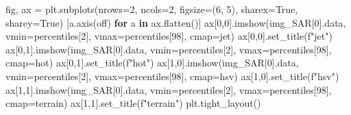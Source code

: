\documentclass[
  french,
  11pt,
  letterpaper,
  open=any,
  twoside=false,
  french]{scrbook}
\newenvironment{Shaded}{\begin{snugshade}}{\end{snugshade}}
\newcommand{\ControlFlowTok}[1]{\textcolor[rgb]{0.00,0.23,0.31}{\textbf{#1}}}
\newcommand{\DecValTok}[1]{\textcolor[rgb]{0.68,0.00,0.00}{#1}}
\newcommand{\KeywordTok}[1]{\textcolor[rgb]{0.00,0.23,0.31}{\textbf{#1}}}
\newcommand{\NormalTok}[1]{\textcolor[rgb]{0.00,0.23,0.31}{#1}}
\newcommand{\OperatorTok}[1]{\textcolor[rgb]{0.37,0.37,0.37}{#1}}
\newcommand{\SpecialStringTok}[1]{\textcolor[rgb]{0.13,0.47,0.30}{#1}}
\newcommand{\StringTok}[1]{\textcolor[rgb]{0.13,0.47,0.30}{#1}}
\newcommand{\VariableTok}[1]{\textcolor[rgb]{0.07,0.07,0.07}{#1}}
\begin{document}
\begin{Shaded}
\begin{Highlighting}[]
\NormalTok{fig, ax }\OperatorTok{=}\NormalTok{ plt.subplots(nrows}\OperatorTok{=}\DecValTok{2}\NormalTok{, ncols}\OperatorTok{=}\DecValTok{2}\NormalTok{, figsize}\OperatorTok{=}\NormalTok{(}\DecValTok{6}\NormalTok{, }\DecValTok{5}\NormalTok{), sharex}\OperatorTok{=}\VariableTok{True}\NormalTok{, sharey}\OperatorTok{=}\VariableTok{True}\NormalTok{)}
\NormalTok{[a.axis(}\StringTok{\textquotesingle{}off\textquotesingle{}}\NormalTok{) }\ControlFlowTok{for}\NormalTok{ a }\KeywordTok{in}\NormalTok{ ax.flatten()]}
\NormalTok{ax[}\DecValTok{0}\NormalTok{,}\DecValTok{0}\NormalTok{].imshow(img\_SAR[}\DecValTok{0}\NormalTok{].data, vmin}\OperatorTok{=}\NormalTok{percentiles[}\DecValTok{2}\NormalTok{], vmax}\OperatorTok{=}\NormalTok{percentiles[}\DecValTok{98}\NormalTok{], cmap}\OperatorTok{=}\StringTok{\textquotesingle{}jet\textquotesingle{}}\NormalTok{)}
\NormalTok{ax[}\DecValTok{0}\NormalTok{,}\DecValTok{0}\NormalTok{].set\_title(}\SpecialStringTok{f"jet"}\NormalTok{)}
\NormalTok{ax[}\DecValTok{0}\NormalTok{,}\DecValTok{1}\NormalTok{].imshow(img\_SAR[}\DecValTok{0}\NormalTok{].data, vmin}\OperatorTok{=}\NormalTok{percentiles[}\DecValTok{2}\NormalTok{], vmax}\OperatorTok{=}\NormalTok{percentiles[}\DecValTok{98}\NormalTok{], cmap}\OperatorTok{=}\StringTok{\textquotesingle{}hot\textquotesingle{}}\NormalTok{)}
\NormalTok{ax[}\DecValTok{0}\NormalTok{,}\DecValTok{1}\NormalTok{].set\_title(}\SpecialStringTok{f"hot"}\NormalTok{)}
\NormalTok{ax[}\DecValTok{1}\NormalTok{,}\DecValTok{0}\NormalTok{].imshow(img\_SAR[}\DecValTok{0}\NormalTok{].data, vmin}\OperatorTok{=}\NormalTok{percentiles[}\DecValTok{2}\NormalTok{], vmax}\OperatorTok{=}\NormalTok{percentiles[}\DecValTok{98}\NormalTok{], cmap}\OperatorTok{=}\StringTok{\textquotesingle{}hsv\textquotesingle{}}\NormalTok{)}
\NormalTok{ax[}\DecValTok{1}\NormalTok{,}\DecValTok{0}\NormalTok{].set\_title(}\SpecialStringTok{f"hsv"}\NormalTok{)}
\NormalTok{ax[}\DecValTok{1}\NormalTok{,}\DecValTok{1}\NormalTok{].imshow(img\_SAR[}\DecValTok{0}\NormalTok{].data, vmin}\OperatorTok{=}\NormalTok{percentiles[}\DecValTok{2}\NormalTok{], vmax}\OperatorTok{=}\NormalTok{percentiles[}\DecValTok{98}\NormalTok{], cmap}\OperatorTok{=}\StringTok{\textquotesingle{}terrain\textquotesingle{}}\NormalTok{)}
\NormalTok{ax[}\DecValTok{1}\NormalTok{,}\DecValTok{1}\NormalTok{].set\_title(}\SpecialStringTok{f"terrain"}\NormalTok{)}
\NormalTok{plt.tight\_layout()}
\end{Highlighting}
\end{Shaded}
\end{document}
